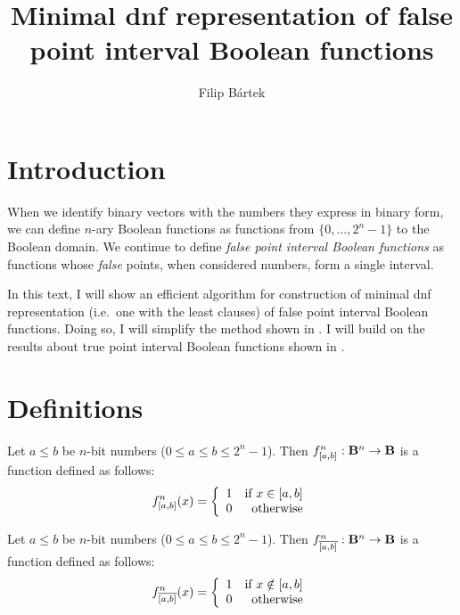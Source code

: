 \documentclass{article}
\author{Filip Bártek}
\title{Minimal \acrshort{dnf} representation of false point interval Boolean functions}
\begin{document}
\maketitle

\section{Introduction}
When we identify binary vectors with the numbers they express in binary form,
we can define $n$-ary Boolean functions
as functions from $\{0, \ldots, 2^n - 1\}$ to the Boolean domain.
We continue to define \emph{false point interval Boolean functions}
as functions whose \emph{false} points,
when considered numbers,
form a single interval.

In this text,
I will show an efficient algorithm
for construction of minimal \acrshort{dnf} representation
(i.e.~one with the least clauses)
of false point interval Boolean functions.
Doing so, I will simplify the method shown in \cite{Dubovsky2012}.
I will build on the results about true point interval Boolean functions
shown in \cite{Schieber2005154}.

\section{Definitions}

\begin{definition}
Let $a \leq b$ be $n$-bit numbers ($0 \leq a \leq b \leq 2^n - 1$).
Then $f^n_{[a, b]}: \mathbf{B}{}^n \rightarrow \mathbf{B}{}$ is a function defined as follows:
\[f^n_{\interval{a}{b}} (x) = \left\{
  \begin{array}{lr}
    1 & $if $ x \in \interval{a}{b}\\
    0 & $otherwise$
  \end{array}
\right.
\]
\end{definition}


\begin{definition}
Let $a \leq b$ be $n$-bit numbers ($0 \leq a \leq b \leq 2^n - 1$).
Then $f^n_{\overline{[a, b]}}: \mathbf{B}{}^n \rightarrow \mathbf{B}{}$ is a function defined as follows:
\[f^n_{\finterval{a}{b}} (x) = \left\{
  \begin{array}{lr}
    1 & $if $ x \notin \interval{a}{b}\\
    0 & $otherwise$
  \end{array}
\right.
\]
\end{definition}
\end{document}

